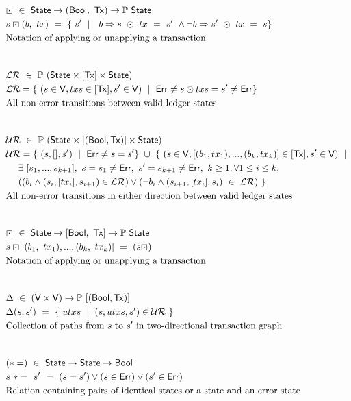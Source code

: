 \begin{figure*}[htb]
  \begin{align*}
    & \boxdot  ~\in~ \State \to (\Bool,~\Tx) \to \powerset{\State} \\
    & s \boxdot (b,~tx) ~=~ \{~s'~\mid~~b \Rightarrow s~\odot~tx~=~s'~ \wedge \neg b \Rightarrow s'~\odot~tx~=~s\} \\
    & \text{Notation of applying or unapplying a transaction} \\
    \nextdef
    & \mathcal{LR}  ~\in~ \powerset (\State \times [\Tx] \times \State) \\
    & \mathcal{LR} = \{~ (s \in \V, txs \in [\Tx], s' \in \V)~\mid~\Err \neq s\odot txs = s' \neq \Err \} \\
    & \text{All non-error transitions between valid ledger states} \\
    \nextdef
    & \mathcal{UR}  ~\in~ \powerset (\State \times [(\Bool, \Tx)] \times \State) \\
    & \mathcal{UR} =\{~(s, [], s')~\mid~\Err\neq s = s'\} ~\cup~ \{~ (s \in \V, [(b_1, tx_1), ... , (b_k, tx_k)] \in [\Tx], s' \in \V)~\mid~\\
    & ~~~~ \exists~ [s_1, ..., s_{k+1}],~s = s_1 \neq \Err,~s' = s_{k+1} \neq \Err, ~k \geq 1, \forall 1 \leq i \leq k,~  \\
    & ~~~~ ((b_i \wedge (s_{i}, [tx_i], s_{i+1}) \in \mathcal{LR}) \vee (\neg b_i \wedge (s_{i+1}, [tx_i], s_{i})~\in~\mathcal{LR})~\} \\
    & \text{All non-error transitions in either direction between valid ledger states} \\
    \nextdef
    & \boxdot  ~\in~ \State \to [\Bool,~\Tx] \to \powerset{\State} \\
    & s \boxdot [(b_1,~tx_1), ..., (b_k,~tx_k)] ~=~ (s \boxdot ) \\
    & \text{Notation of applying or unapplying a transaction} \\
    \nextdef
    & \Delta ~\in~ (\V \times \V) \to \powerset{[(\Bool, \Tx)]} \\
    & \Delta (s, s')~=~\{~utxs~\mid~ (s, utxs, s') \in \mathcal{UR}~\} \\
    & \text{Collection of paths from $s$ to $s'$ in two-directional transaction graph} \\
    \nextdef
    & (*=) ~\in~ \State \to \State \to \Bool \\
    & s~ *=~ s' ~=~ (s = s') \vee (s \in \Err) \vee (s' \in \Err) \\
    & \text{Relation containing pairs of identical states or a state and an error state} \\

\end{align*}
\end{figure*}
